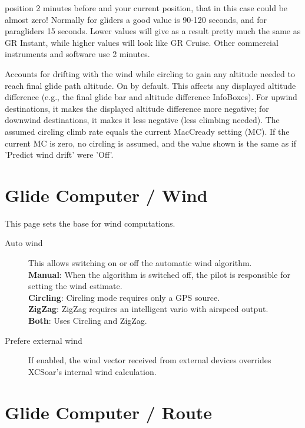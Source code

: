 \begin{description}
  position 2 minutes before and your current position, that in this case could be 
  almost zero! Normally for gliders a good value is 90-120 seconds, and for paragliders 
  15 seconds. Lower values will give as a result pretty much the same as GR Instant, 
  while higher values will look like GR Cruise. Other commercial instruments and 
  software use 2 minutes.
\item[Predict wind drift*]  \label{conf:predict-drift} Accounts for drifting with
  the wind while circling to gain any altitude needed to reach final glide path
  altitude. On by default. This affects any displayed altitude difference (e.g.,
  the final glide bar and altitude difference InfoBoxes). For upwind destinations,
  it makes the displayed altitude difference more negative; for downwind
  destinations, it makes it less negative (less climbing needed). The assumed
  circling climb rate equals the current MacCready setting (MC). If the current MC
  is zero, no circling is assumed, and the value shown is the same as if 'Predict
  wind drift' were 'Off'.
\end{description}


\section{Glide Computer / Wind} \label{sec:wind}

This page sets the base for wind computations.

\begin{description}
\item[Auto wind]  \label{conf:autowind} This allows switching on or off the
  automatic wind algorithm. \\
  {\bf Manual}: When the algorithm is switched off, the pilot is responsible for
  setting the wind estimate. \\
  {\bf Circling}: Circling mode requires only a GPS source. \\
  {\bf ZigZag}: ZigZag requires an intelligent vario with airspeed output. \\
  {\bf Both}:  Uses Circling and ZigZag.
\item[Prefere external wind]  If enabled, the wind vector received from external
  devices overrides XCSoar's internal wind calculation.
\end{description}


\section{Glide Computer / Route}\label{sec:glide-comp-route}

